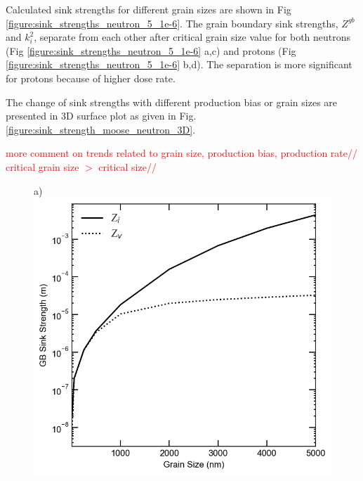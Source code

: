 \documentclass[utf8]{frontiersSCNS} %
\begin{document}
    Calculated sink strengths for different grain sizes are shown in Fig \ref{figure:sink_strengths_neutron_5_1e-6}. The grain boundary sink strengths, ${Z^{gb}}$ and ${k^2_i}$, separate from each other after critical grain size value for both neutrons (Fig \ref{figure:sink_strengths_neutron_5_1e-6} a,c) and protons (Fig \ref{figure:sink_strengths_neutron_5_1e-6} b,d). The separation is more significant for protons because of higher dose rate.

    The change of sink strengths with different production bias or grain sizes are presented in 3D surface plot as given in Fig. \ref{figure:sink_strength_moose_neutron_3D}.

\textcolor{red}{
more comment on trends related to grain size, production bias, production rate//
critical grain size $>$ critical size//
}
    \begin{figure}[h!]  %
        \centering
        a)\includegraphics[scale=0.55]{sink_strength_moose_neutron_5_Z_scaled}

\end{figure}
\end{document}

